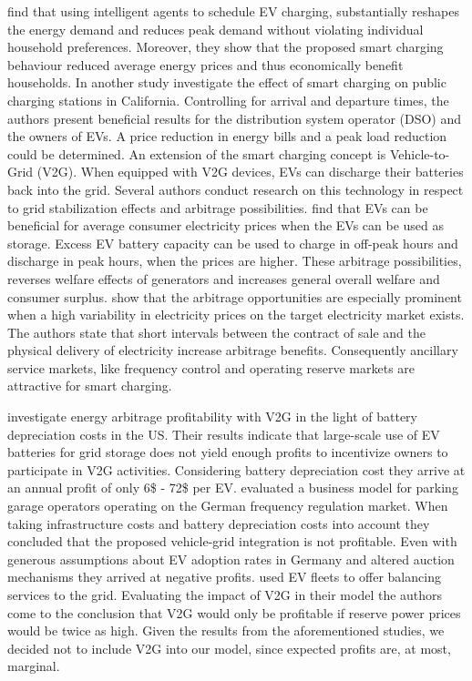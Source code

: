 \documentclass[12pt, article]{article}
\begin{document}
\textcite{valogianni14_effec_manag_elect_vehic_storag} find that using intelligent
agents to schedule EV charging, substantially reshapes the energy demand and
reduces peak demand without violating individual household preferences. Moreover,
they show that the proposed smart charging behaviour reduced average energy
prices and thus economically benefit households. In another study
\textcite{kara15_estim_benef_elect_vehic_smart} investigate the effect of smart
charging on public charging stations in California. Controlling for
arrival and departure times, the authors present beneficial results for the
distribution system operator (DSO) and the owners of EVs. A price
reduction in energy bills and a peak load reduction could be determined.
An extension of the smart charging concept is Vehicle-to-Grid (V2G). When
equipped with V2G devices, EVs can discharge their batteries back into the grid.
Several authors conduct research on this technology in respect to grid stabilization
effects and arbitrage possibilities.
\textcite{schill11_elect_vehic_imper_elect_market} find that EVs can be beneficial
for average consumer electricity prices when the EVs can be used as storage.
Excess EV battery capacity can be used to charge in off-peak hours and discharge
in peak hours, when the prices are higher. These arbitrage possibilities,
reverses welfare effects of generators and increases general overall welfare and
consumer surplus. \textcite{tomic07_using_fleet_elect_drive_vehic_grid_suppor}
show that the arbitrage opportunities are especially prominent when a high
variability in electricity prices on the target electricity market exists. The
authors state that short intervals between the contract of sale and the physical
delivery of electricity increase arbitrage benefits. Consequently ancillary service
markets, like frequency control and operating reserve markets are attractive for
smart charging.

\textcite{peterson10_econom_using_plug_in_hybrid} investigate energy arbitrage
profitability with V2G in the light of battery depreciation costs in the US.
Their results indicate that large-scale use of EV batteries for grid storage
does not yield enough profits to incentivize owners to participate in V2G
activities. Considering battery depreciation cost they arrive at an annual
profit of only 6\$ - 72\$ per EV.
\textcite{brandt17_evaluat_busin_model_vehic_grid_integ} evaluated a business
model for parking garage operators operating on the German frequency regulation
market. When taking infrastructure costs and battery depreciation costs into
account they concluded that the proposed vehicle-grid
integration is not profitable. Even with generous assumptions about EV adoption
rates in Germany and altered auction mechanisms they arrived at negative profits.
\parencite{kahlen17_fleet} used EV fleets to offer balancing services to the grid.
Evaluating the impact of V2G in their model the authors come to the conclusion
that V2G would only be profitable if reserve power prices would be twice as
high. Given the results from the aforementioned studies, we decided not to
include V2G into our model, since expected profits are, at most, marginal.
\end{document}
